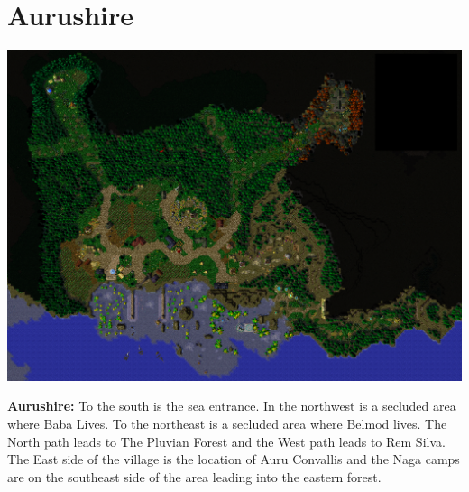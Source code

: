 \documentclass[letterpaper,10pt,twoside,twocolumn,openany]{book}
\begin{document}
\section{Aurushire}
\begin{center}
	\includegraphics[width=\linewidth]{img/Aurushire.png}
	
	{\textbf{Aurushire:} To the south is the sea entrance. In the northwest is a secluded area where Baba Lives. To the northeast is a secluded area where Belmod lives. The North path leads to The Pluvian Forest and the West path leads to Rem Silva. The East side of the village is the location of Auru Convallis and the Naga camps are on the southeast side of the area leading into the eastern forest.}
\end{center}
\end{document}
